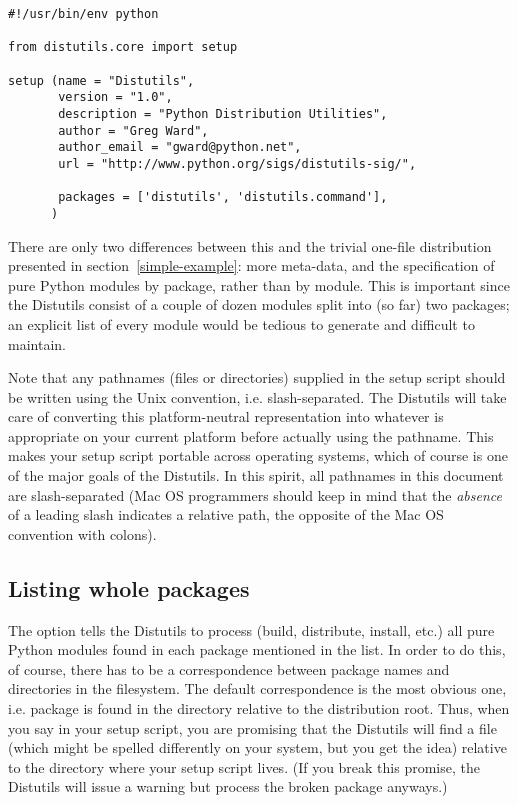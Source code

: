 \documentclass{howto}
\begin{document}
\begin{verbatim}
#!/usr/bin/env python

from distutils.core import setup

setup (name = "Distutils",
       version = "1.0",
       description = "Python Distribution Utilities",
       author = "Greg Ward",
       author_email = "gward@python.net",
       url = "http://www.python.org/sigs/distutils-sig/",

       packages = ['distutils', 'distutils.command'],
      )
\end{verbatim}
There are only two differences between this and the trivial one-file
distribution presented in section~\ref{simple-example}: more
meta-data, and the specification of pure Python modules by package,
rather than by module.  This is important since the Distutils consist of
a couple of dozen modules split into (so far) two packages; an explicit
list of every module would be tedious to generate and difficult to
maintain.

Note that any pathnames (files or directories) supplied in the setup
script should be written using the Unix convention, i.e.
slash-separated.  The Distutils will take care of converting this
platform-neutral representation into whatever is appropriate on your
current platform before actually using the pathname.  This makes your
setup script portable across operating systems, which of course is one
of the major goals of the Distutils.  In this spirit, all pathnames in
this document are slash-separated (Mac OS programmers should keep in
mind that the \emph{absence} of a leading slash indicates a relative
path, the opposite of the Mac OS convention with colons).


\subsection{Listing whole packages}
\label{listing-packages}

The  option tells the Distutils to process (build,
distribute, install, etc.) all pure Python modules found in each package
mentioned in the  list.  In order to do this, of
course, there has to be a correspondence between package names and
directories in the filesystem.  The default correspondence is the most
obvious one, i.e. package  is found in the directory
 relative to the distribution root.  Thus, when you say
 in your setup script, you are promising that
the Distutils will find a file  (which might
be spelled differently on your system, but you get the idea) relative to
the directory where your setup script lives.  (If you break this
promise, the Distutils will issue a warning but process the broken
package anyways.)
\end{document}
